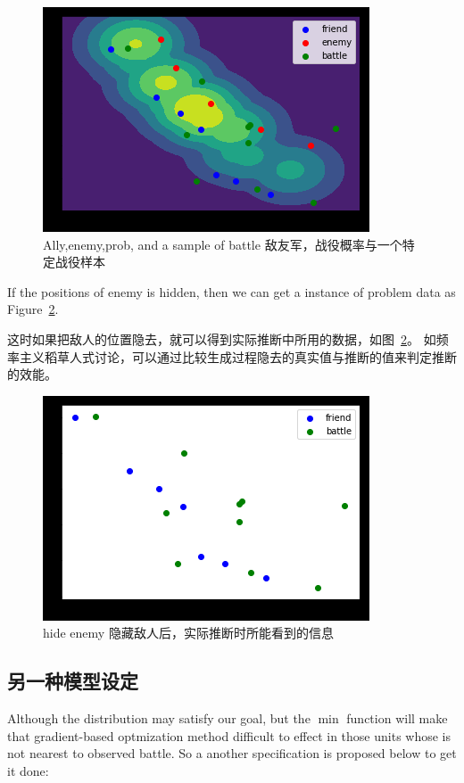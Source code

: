 \documentclass{article}
\begin{document}
\begin{figure}[ht]
\includegraphics[width=0.6\linewidth]{state_sample_battle.png}
\caption{Ally,enemy,prob, and a sample of battle 敌友军，战役概率与一个特定战役样本}
\label{fig:stateSampleBattle}
\end{figure}

If the positions of enemy is hidden, 
then we can get a instance of problem data as Figure~\ref{fig:stateNoEnemy}.

这时如果把敌人的位置隐去，就可以得到实际推断中所用的数据，如图~\ref{fig:stateNoEnemy}。
如频率主义稻草人式讨论，可以通过比较生成过程隐去的真实值与推断的值来判定推断的效能。

\begin{figure}[ht]
\includegraphics[width=0.6\linewidth]{state_no_enemy.png}
\caption{hide enemy 隐藏敌人后，实际推断时所能看到的信息}
\label{fig:stateNoEnemy}
\end{figure}

\subsection{另一种模型设定}

Although the distribution may satisfy our goal, 
but the $\min$ function will make that gradient-based optmization method difficult to effect 
in those units whose is not nearest to observed battle. 
So a another specification is proposed below to get it done:
\end{document}
